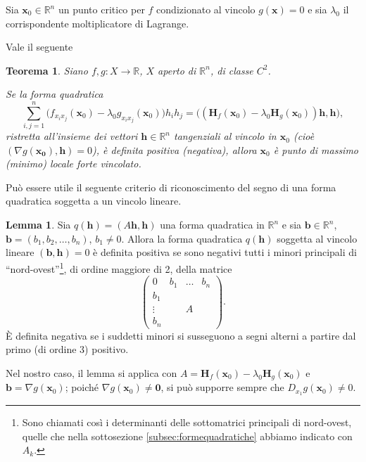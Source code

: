 \documentclass[a4paper]{book}
\numberwithin{equation}{section}
\theoremstyle{plain}
\newtheorem{teor}{Teorema}[section]
\theoremstyle{definition}
\newtheorem{lem}{Lemma}[section]
\theoremstyle{remark}
\renewcommand{\vec}{\boldsymbol}
\theoremstyle{example}
\begin{document}
Sia $\vec{x}_0 \in \mathbb{R}^n$ un punto critico per $f$ condizionato al vincolo $g(\vec{x}) = 0$ e sia $\lambda_0$ il corrispondente moltiplicatore di Lagrange.

Vale il seguente
\begin{teor}
Siano $f, g \colon X \to \mathbb{R}$, $X$ aperto di $\mathbb{R}^n$, di classe $C^2$.

Se la forma quadratica
	\begin{equation}
	\label{eqn:naturacritvinc}
	\sum_{i,j=1}^n\bigl(f_{x_ix_j}(\vec{x}_0) - \lambda_0 g_{x_ix_j}(\vec{x}_0) \bigr) h_ih_j = \bigl( (\mathbf{H}_f(\vec{x}_0) - \lambda_0\mathbf{H}_g(\vec{x}_0))\vec{h}, \vec{h}\bigr),
	\end{equation}
ristretta all'insieme dei vettori $\vec{h} \in \mathbb{R}^n$ tangenziali al vincolo in $\vec{x}_0$ (cioè $(\nabla g(\vec{x_0}), \vec{h}) = 0$), è definita positiva (negativa), allora $\vec{x}_0$ è punto di massimo (minimo) locale forte vincolato.
\end{teor}

Può essere utile il seguente criterio di riconoscimento del segno di una forma quadratica soggetta a un vincolo lineare.

\begin{lem}
Sia $q(\vec{h}) = (A\vec{h}, \vec{h})$ una forma quadratica in $\mathbb{R}^n$ e sia $\vec{b} \in \mathbb{R}^n$, $\vec{b} = (b_1, b_2, \dots, b_n)$, $b_1 \ne 0$. Allora la forma quadratica $q(\vec{h})$ soggetta al vincolo lineare $(\vec{b}, \vec{h}) = 0$ è definita positiva se sono negativi tutti i minori principali di ``nord-ovest''\footnote{Sono chiamati così i determinanti delle sottomatrici principali di nord-ovest, quelle che nella sottosezione \ref{subsec:formequadratiche} abbiamo indicato con $A_k$.}, di ordine maggiore di 2, della matrice
	\begin{equation}
	\begin{pmatrix}
	0 & b_1 & \dots & b_n  \\
	b_1 \\
	\vdots &  &A \\
	b_n
	\end{pmatrix}.
	\end{equation}
È definita negativa se i suddetti minori si susseguono a segni alterni a partire dal primo (di ordine 3) positivo.
\end{lem}

Nel nostro caso, il lemma si applica con $A = \mathbf{H}_f(\vec{x}_0) - \lambda_0 \mathbf{H}_g(\vec{x}_0)$ e $\vec{b} = \nabla g(\vec{x}_0)$; poiché $\nabla g(\vec{x}_0) \ne \vec{0}$, si può supporre sempre che $D_{x_1}g(\vec{x}_0) \ne 0$.
\end{document}
